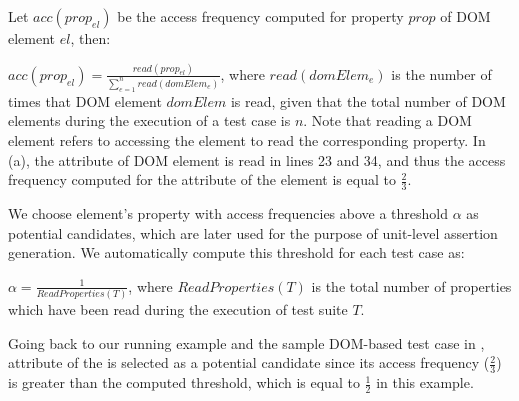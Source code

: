Let $acc(prop_{el})$ be the access frequency computed for property $prop$ of DOM element $el$, then:
 
$acc(prop_{el})=\frac{read(prop_{el})}{\sum _{e=1}^{n} read(domElem_e)}$, where $read(domElem_{e})$ is the number of times that DOM element $domElem$ is read, given that the total number of DOM elements during the execution of a test case is $n$.
Note that reading a DOM element refers to accessing the element to read the corresponding property. In (a), the  attribute of DOM element  is read in lines 23 and 34, and thus the access frequency
computed for the  attribute of the element is equal to $\frac{2}{3}$.

We choose element's property with access frequencies above a threshold $\alpha$ as potential candidates, which are later used for the purpose of unit-level assertion generation. We automatically compute this threshold for each test case as: 

$\alpha=\frac{1}{ReadProperties(T)}$, where $ReadProperties(T)$ is the total number of properties which have been read during the execution of test suite $T$.

Going back to our running example and the sample DOM-based test case in ,  attribute of the  is selected as a potential candidate since its access frequency ($\frac{2}{3}$) is greater than the computed threshold, which is equal to $\frac{1}{2}$ in this example.        
